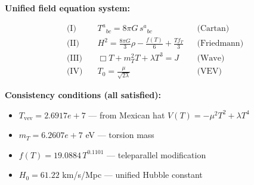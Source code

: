 
\textbf{Unified field equation system:}

\begin{align}
  \text{(I)} \quad & T^a{}_{bc} = 8\pi G \, s^a{}_{bc} && \text{(Cartan)} \\
  \text{(II)} \quad & H^2 = \frac{8\pi G}{3}\rho - \frac{f(T)}{6} + \frac{Tf_T}{3} && \text{(Friedmann)} \\
  \text{(III)} \quad & \Box T + m_T^2 T + \lambda T^3 = J && \text{(Wave)} \\
  \text{(IV)} \quad & T_0 = \frac{\mu}{\sqrt{2\lambda}} && \text{(VEV)}
\end{align}

\textbf{Consistency conditions (all satisfied):}
\begin{itemize}
  \item $T_{\text{vev}} = 2.6917e+7$ — from Mexican hat $V(T) = -\mu^2 T^2 + \lambda T^4$
  \item $m_T = 6.2607e+7$ eV — torsion mass
  \item $f(T) = 19.0884 \, T^{0.1101}$ — teleparallel modification
  \item $H_0 = 61.22$ km/s/Mpc — unified Hubble constant
\end{itemize}
